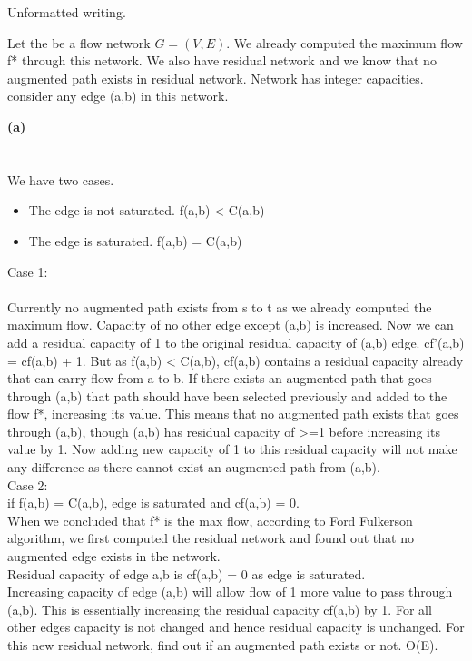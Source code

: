 
Unformatted writing. 

Let the be a flow network $G=(V,E)$. We already computed the maximum flow f* through this network. We also have residual network and we know that no augmented path exists in residual network.  
Network has integer capacities. consider any edge (a,b) in this network. 

\textbf{(a)} \\
\\
\\
We have two cases.
\begin{itemize}
	\item The edge is not saturated. f(a,b) < C(a,b)
	\item The edge is saturated. f(a,b) = C(a,b)
\end{itemize}

Case 1: \\
\\
	Currently no augmented path exists from s to t as we already computed the maximum flow. Capacity of no other edge except (a,b) is increased. 
	Now we can add a residual capacity of 1 to the original residual capacity of (a,b) edge. cf'(a,b) = cf(a,b) + 1. 
	But as f(a,b) < C(a,b), cf(a,b) contains a residual capacity already that can carry flow from a to b. If there exists an augmented path that goes through (a,b) that path should have been selected previously and added to the flow f*, increasing its value. This means that no augmented path exists that goes through (a,b), though (a,b) has residual capacity of >=1 before increasing its value by 1. Now adding new capacity of 1 to this residual capacity will not make any difference as there cannot exist an augmented path from (a,b). 
\\
Case 2:\\
	if f(a,b) = C(a,b), edge is saturated and cf(a,b) = 0. \\
	When we concluded that f* is the max flow, according to Ford Fulkerson algorithm, we first computed the residual network and found out that no augmented edge exists in the network.\\ 
	Residual capacity of edge a,b is cf(a,b) = 0 as edge is saturated. \\
	Increasing capacity of edge (a,b) will allow flow of 1 more value to pass through (a,b). This is essentially increasing the residual capacity cf(a,b) by 1. For all other edges capacity is not changed and hence residual capacity is unchanged. For this new residual network, find out if an augmented path exists or not. O(E). \\
	
